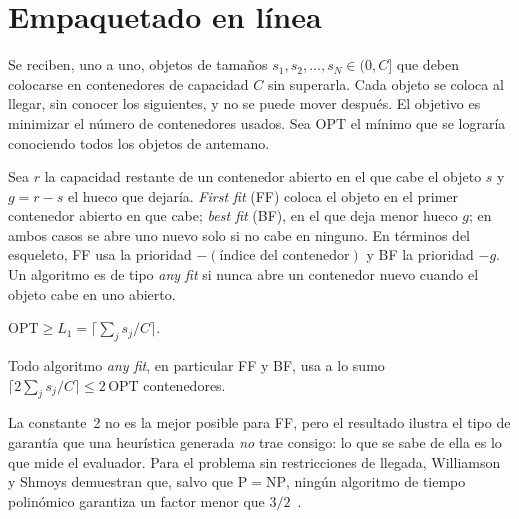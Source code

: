 \section{Empaquetado en línea}

\begin{definicion}\label{def:bp}
Se reciben, uno a uno, objetos de tamaños $s_1,s_2,\dots,s_N\in(0,C]$ que deben colocarse en contenedores de capacidad $C$ sin superarla. Cada objeto se coloca al llegar, sin conocer los siguientes, y no se puede mover después. El objetivo es minimizar el número de contenedores usados. Sea $\mathrm{OPT}$ el mínimo que se lograría conociendo todos los objetos de antemano.
\end{definicion}

\begin{definicion}\label{def:ff-bf}
Sea $r$ la capacidad restante de un contenedor abierto en el que cabe el objeto $s$ y $g=r-s$ el hueco que dejaría. \emph{First fit} (FF) coloca el objeto en el primer contenedor abierto en que cabe; \emph{best fit} (BF), en el que deja menor hueco $g$; en ambos casos se abre uno nuevo solo si no cabe en ninguno. En términos del esqueleto, FF usa la prioridad $-(\text{índice del contenedor})$ y BF la prioridad $-g$. Un algoritmo es de tipo \emph{any fit} si nunca abre un contenedor nuevo cuando el objeto cabe en uno abierto.
\end{definicion}

\begin{lema}[Cota $L_1$]\label{lem:l1}
$\mathrm{OPT}\ge L_1=\bigl\lceil\sum_{j}s_j/C\bigr\rceil$.
\end{lema}

\begin{teorema}\label{teo:anyfit}
Todo algoritmo \emph{any fit}, en particular FF y BF, usa a lo sumo $\lceil 2\sum_j s_j/C\rceil\le 2\,\mathrm{OPT}$ contenedores.
\end{teorema}

La constante~2 no es la mejor posible para FF, pero el resultado ilustra el tipo de garantía que una heurística generada \emph{no} trae consigo: lo que se sabe de ella es lo que mide el evaluador. Para el problema sin restricciones de llegada, Williamson y Shmoys demuestran que, salvo que $\mathrm{P}=\mathrm{NP}$, ningún algoritmo de tiempo polinómico garantiza un factor menor que $3/2$~\cite[§3.3]{ws}.

\addtocounter{definicion}{1}%

